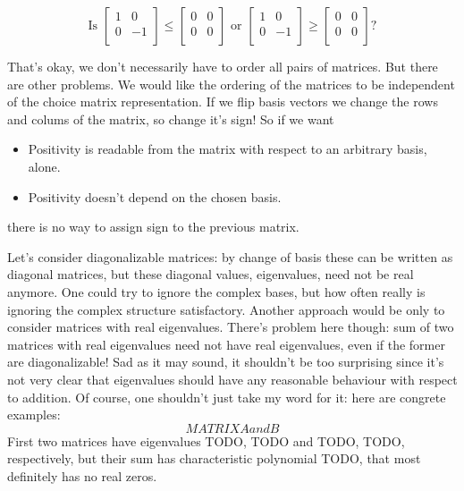 \[
	\text{Is }
	\begin{bmatrix}
		1 & 0 \\
		0 & -1 \\
	\end{bmatrix}
	\leq
	\begin{bmatrix}
		0 & 0 \\
		0 & 0 \\
	\end{bmatrix}
	\text{ or }
	\begin{bmatrix}
		1 & 0 \\
		0 & -1 \\
	\end{bmatrix}
	\geq
	\begin{bmatrix}
		0 & 0 \\
		0 & 0 \\
	\end{bmatrix}
	\text{?}
\]

That's okay, we don't necessarily have to order all pairs of matrices. But there are other problems. We would like the ordering of the matrices to be independent of the choice matrix representation. If we flip basis vectors we change the rows and colums of the matrix, so change it's sign! So if we want
\begin{itemize}
	\item Positivity is readable from the matrix with respect to an arbitrary basis, alone.
	\item Positivity doesn't depend on the chosen basis.
\end{itemize}
there is no way to assign sign to the previous matrix.

Let's consider diagonalizable matrices: by change of basis these can be written as diagonal matrices, but these diagonal values, eigenvalues, need not be real anymore. One could try to ignore the complex bases, but how often really is ignoring the complex structure satisfactory. Another approach would be only to consider matrices with real eigenvalues. There's problem here though: sum of two matrices with real eigenvalues need not have real eigenvalues, even if the former are diagonalizable! Sad as it may sound, it shouldn't be too surprising since it's not very clear that eigenvalues should have any reasonable behaviour with respect to addition. Of course, one shouldn't just take my word for it: here are congrete examples:
\[
	MATRIX A and B
\]
First two matrices have eigenvalues TODO, TODO and TODO, TODO, respectively, but their sum has characteristic polynomial TODO, that most definitely has no real zeros.

